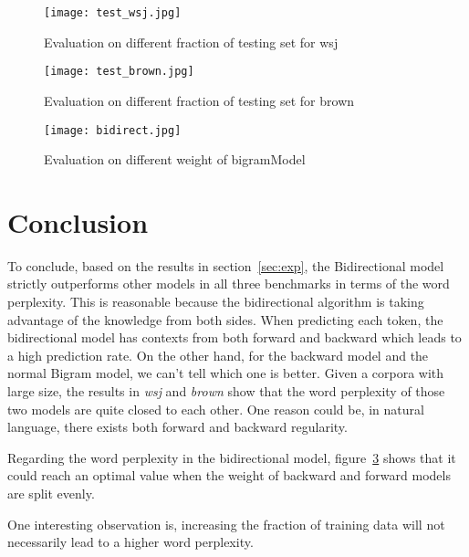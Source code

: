 \documentclass[10pt]{article}
\begin{document}
\begin{figure}
\centering
\texttt{[image: test\_wsj.jpg]}
\caption{Evaluation on different fraction of testing set for wsj}\label{fig:test2}
\end{figure}

\begin{figure}
\centering
\texttt{[image: test\_brown.jpg]}
\caption{Evaluation on different fraction of testing set for brown}\label{fig:test3}
\end{figure}

\begin{figure}
\centering
\texttt{[image: bidirect.jpg]}
\caption{Evaluation on different weight of bigramModel}\label{fig:bi}
\end{figure}
\section{Conclusion}

To conclude, based on the results in section~\ref{sec:exp}, the Bidirectional model strictly outperforms other models in all three benchmarks in terms of the word perplexity. This is reasonable because the bidirectional algorithm is taking advantage of the knowledge from both sides. When predicting each token, the bidirectional model has contexts from both forward and backward which leads to a high prediction rate. On the other hand, for the backward model and the normal Bigram model, we can't tell which one is better. Given a corpora with large size, the results in \emph{wsj} and \emph{brown} show that the word perplexity of those two models are quite closed to each other. One reason could be, in natural language, there exists both forward and backward regularity.

Regarding the word perplexity in the bidirectional model, figure~\ref{fig:bi} shows that it could reach an optimal value when the weight of backward and forward models are split evenly.

One interesting observation is, increasing the fraction of training data will not necessarily lead to a higher word perplexity.
\end{document}
